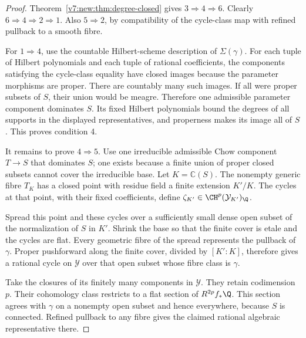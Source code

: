 \begin{proof}
Theorem~\ref{v7:new:thm:degree-closed} gives \(3\Rightarrow4\Rightarrow6\).
Clearly \(6\Rightarrow4\Rightarrow2\Rightarrow1\).
Also \(5\Rightarrow2\), by compatibility of the cycle-class map with
refined pullback to a smooth fibre.

For \(1\Rightarrow4\), use the countable Hilbert-scheme description
of \(\Sigma(\gamma)\). For each tuple of Hilbert polynomials and
each tuple of rational coefficients, the components satisfying
the cycle-class equality have closed images because the parameter morphisms are proper. There are
countably many such images. If all were proper subsets of \(S\),
their union would be meagre. Therefore one admissible parameter
component dominates \(S\). Its fixed Hilbert polynomials bound the
degrees of all supports in the displayed representatives, and
properness makes its image all of \(S\). This proves condition 4.

It remains to prove \(4\Rightarrow5\). Use one irreducible admissible
Chow component \(T\to S\) that dominates \(S\); one exists because a
finite union of proper closed subsets cannot cover the irreducible
base. Let \(K=\mathbb C(S)\). The nonempty generic fibre \(T_K\)
has a closed point with residue field a finite extension \(K'/K\).
The cycles at that point, with their fixed coefficients, define
\(\zeta_{K'}\in\CH^p(\mathcal Y_{K'})_\Q\).

Spread this point and these cycles over a sufficiently small dense
open subset of the normalization of \(S\) in \(K'\). Shrink the
base so that the finite cover is etale and the cycles are flat.
Every geometric fibre of the spread represents the pullback of
\(\gamma\). Proper pushforward along the finite cover, divided by
\([K':K]\), therefore gives a rational cycle on \(\mathcal Y\) over
that open subset whose fibre class is \(\gamma\).

Take the closures of its finitely many components in \(\mathcal Y\).
They retain codimension \(p\). Their cohomology class restricts to
a flat section of \(R^{2p}f_*\Q\). This section agrees with
\(\gamma\) on a nonempty open subset and hence everywhere, because
\(S\) is connected. Refined pullback to any fibre gives the claimed
rational algebraic representative there.
\end{proof}

